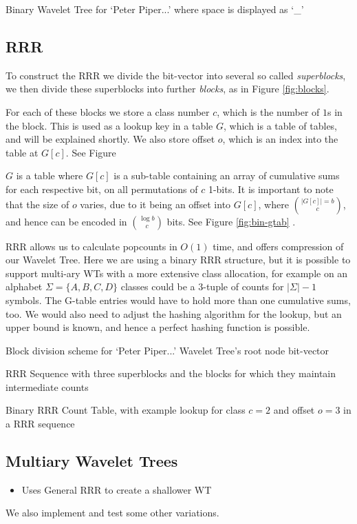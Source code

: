 			{Binary Wavelet Tree for `Peter Piper...' where space is displayed
			as `\_'}

\subsection{RRR}
To construct the RRR we divide the bit-vector into several so called \emph{superblocks}, we then divide these superblocks into further \emph{blocks}, as in Figure \ref{fig:blocks}.

For each of these blocks we store a class number $c$, which is the number of $1$s in the block. This is used as a lookup key in a table $G$, which is a table of tables, and will be explained shortly. We also store offset $o$, which is an index into the table at $G[c]$. See Figure%

$G$ is a table where $G[c]$ is a sub-table containing an array of cumulative sums for each respective bit, on all permutations of $c$ 1-bits. It is important to note that the size of $o$ varies, due to it being an offset into $G[c]$, where $|G[c]| = b \choose c$, and hence can be encoded in $\log b \choose c$ bits. See Figure \ref{fig:bin-gtab} .

RRR allows us to calculate popcounts in $O(1)$ time, and offers compression of our Wavelet Tree. Here we are using a binary RRR structure, but it is possible to support multi-ary WTs with a more extensive class allocation, for example on an alphabet $\Sigma = \{ A, B, C, D \}$ classes could be a 3-tuple of counts for $|\Sigma| - 1$ symbols. The G-table entries would have to hold more than one cumulative sums, too. We would also need to adjust the hashing algorithm for the lookup, but an upper bound is known, and hence a perfect hashing function is possible.

			{Block division scheme for `Peter Piper...' Wavelet Tree's root
			node bit-vector}

		{RRR Sequence with three superblocks and the blocks for which they
		maintain intermediate counts}

			{Binary RRR Count Table, with example lookup for class $c = 2$
			and offset $o = 3$ in a RRR sequence}
			
\subsection{Multiary Wavelet Trees}
\begin{itemize}
\item
  Uses General RRR to create a shallower WT
\end{itemize}
We also implement and test some other variations.

